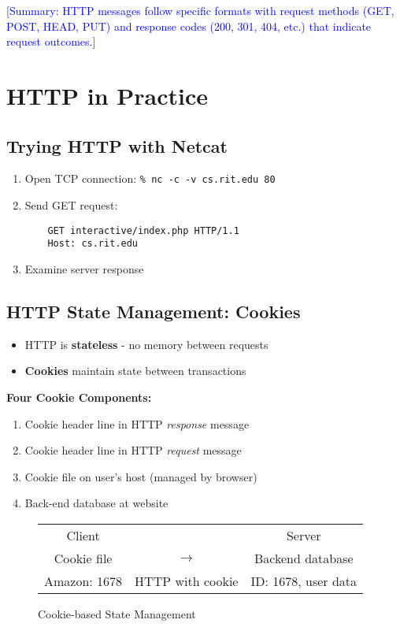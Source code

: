 \documentclass[12pt]{article}
\begin{document}
\textcolor{blue}{[Summary: HTTP messages follow specific formats with request methods (GET, POST, HEAD, PUT) and response codes (200, 301, 404, etc.) that indicate request outcomes.]}

\section{HTTP in Practice}

\subsection{Trying HTTP with Netcat}
\begin{enumerate}
    \item Open TCP connection: \texttt{\% nc -c -v cs.rit.edu 80}
    \item Send GET request:
          \begin{verbatim}
    GET interactive/index.php HTTP/1.1
    Host: cs.rit.edu
    \end{verbatim}
    \item Examine server response
\end{enumerate}

\subsection{HTTP State Management: Cookies}
\begin{itemize}
    \item HTTP is \textbf{stateless} - no memory between requests
    \item \textbf{Cookies} maintain state between transactions
\end{itemize}

\textbf{Four Cookie Components:}
\begin{enumerate}
    \item Cookie header line in HTTP \textit{response} message
    \item Cookie header line in HTTP \textit{request} message
    \item Cookie file on user's host (managed by browser)
    \item Back-end database at website
\end{enumerate}

\begin{figure}[h]
    \centering
    \begin{tabular}{c c c}
        Client       &                  & Server              \\
        Cookie file  & $\rightarrow$    & Backend database    \\
        Amazon: 1678 & HTTP with cookie & ID: 1678, user data \\
    \end{tabular}
    \caption{Cookie-based State Management}
\end{figure}
\end{document}
